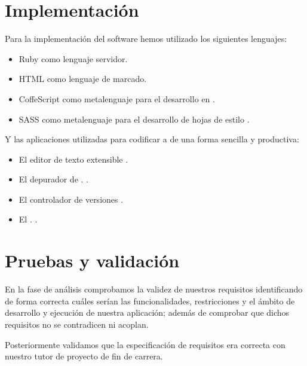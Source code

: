 
\newpage

\clearpage
\section{Implementación}
Para la implementación del software hemos utilizado los siguientes lenguajes:

\begin{itemize}
\item Ruby como lenguaje servidor.
\item HTML como lenguaje de marcado.
\item CoffeScript como metalenguaje para el desarrollo en \cite{lang:coffescript}.
\item SASS como metalenguaje para el desarrollo de hojas de estilo \cite{lang:sass}.
\end{itemize}

Y las aplicaciones utilizadas para codificar a de una forma sencilla y
productiva:

\begin{itemize}
\item El editor de texto extensible  \cite{prog:sublimetext2}.
\item El depurador de  \cite{prog:firefox} .
  \cite{prog:firebug}.
\item El controlador de versiones  \cite{wiki:GIT}.
\item El  .
  \cite{prog:twitter_bootstrap}.
\end{itemize}

\section{Pruebas y validación}
En la fase de análisis comprobamos la validez de nuestros requisitos
identificando de forma correcta cuáles serían las funcionalidades, restricciones
y el ámbito de desarrollo y ejecución de nuestra aplicación; además de comprobar
que dichos requisitos no se contradicen ni acoplan.

Posteriormente validamos que la especificación de requisitos era correcta con
nuestro tutor de proyecto de fin de carrera.

